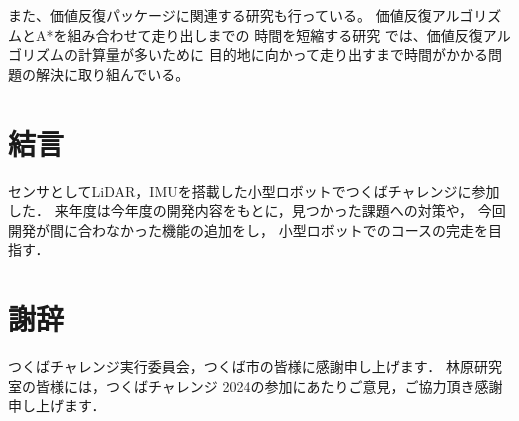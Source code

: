 \documentclass[twocolumn,9pt]{jsproceedings}
\begin{document}
また、価値反復パッケージに関連する研究も行っている。
価値反復アルゴリズムとA*を組み合わせて走り出しまでの
時間を短縮する研究\cite{中村2024}
では、価値反復アルゴリズムの計算量が多いために
目的地に向かって走り出すまで時間がかかる問題の解決に取り組んでいる。







\section{結言}
センサとしてLiDAR，IMUを搭載した小型ロボットでつくばチャレンジに参加した．
来年度は今年度の開発内容をもとに，見つかった課題への対策や，
今回開発が間に合わなかった機能の追加をし，
小型ロボットでのコースの完走を目指す．
%

\section*{謝辞}
つくばチャレンジ実行委員会，つくば市の皆様に感謝申し上げます．
林原研究室の皆様には，つくばチャレンジ 2024の参加にあたりご意見，ご協力頂き感謝申し上げます．
\end{document}
